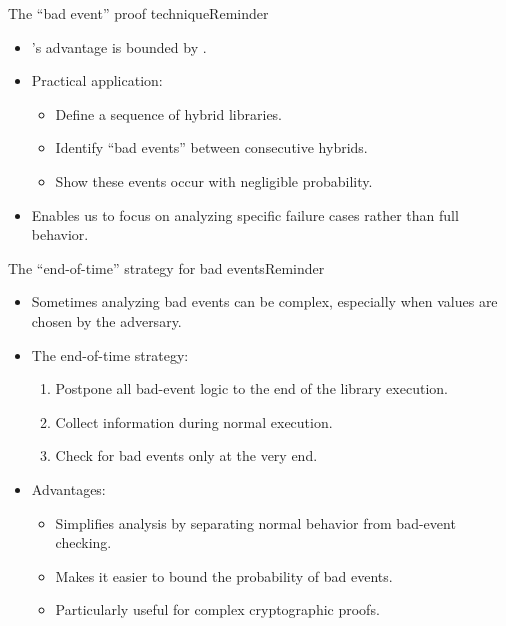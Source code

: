 \documentclass[aspectratio=169, lualatex, handout]{beamer}
\begin{document}
\begin{frame}{The ``bad event'' proof technique}{Reminder}
	\begin{itemize}[<+->]
		\item \prog{}'s advantage is bounded by .
		\item Practical application:
		      \begin{itemize}[<+->]
			      \item Define a sequence of hybrid libraries.
			      \item Identify ``bad events'' between consecutive hybrids.
			      \item Show these events occur with negligible probability.
		      \end{itemize}
		\item Enables us to focus on analyzing specific failure cases rather than full behavior.
	\end{itemize}
\end{frame}

\begin{frame}{The ``end-of-time'' strategy for bad events}{Reminder}
	\begin{itemize}[<+->]
		\item Sometimes analyzing bad events can be complex, especially when values are chosen by the adversary.
		\item The end-of-time strategy:
		      \begin{enumerate}[<+->]
			      \item Postpone all bad-event logic to the end of the library execution.
			      \item Collect information during normal execution.
			      \item Check for bad events only at the very end.
		      \end{enumerate}
		\item Advantages:
		      \begin{itemize}[<+->]
			      \item Simplifies analysis by separating normal behavior from bad-event checking.
			      \item Makes it easier to bound the probability of bad events.
			      \item Particularly useful for complex cryptographic proofs.
		      \end{itemize}
	\end{itemize}
\end{frame}
\end{document}
